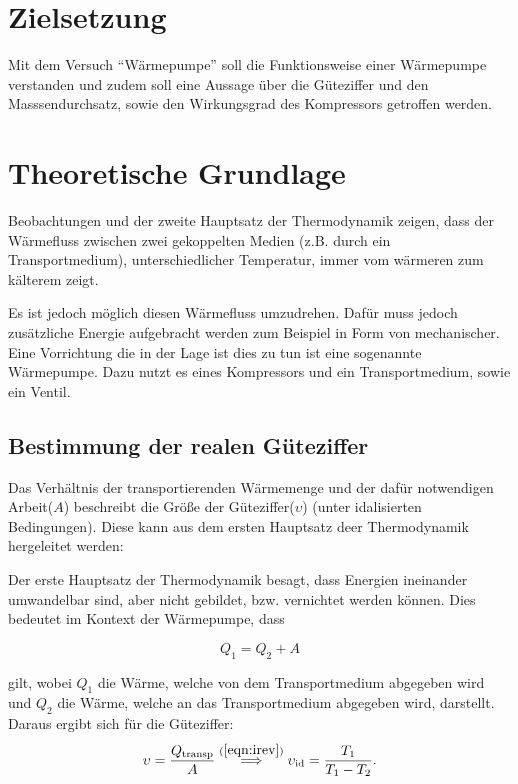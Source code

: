 
\usepackage{longtable}


    \tableofcontents
    
    \newpage
    \section{Zielsetzung}
    Mit dem Versuch "`Wärmepumpe"' soll die Funktionsweise einer Wärmepumpe verstanden und zudem soll eine Aussage über die Güteziffer und den Masssendurchsatz,
    sowie den Wirkungsgrad des Kompressors getroffen werden.

    \section{Theoretische Grundlage}
    Beobachtungen und der zweite Hauptsatz der Thermodynamik zeigen, dass der Wärmefluss zwischen zwei gekoppelten Medien (z.B. durch ein Transportmedium), unterschiedlicher Temperatur, immer vom wärmeren zum kälterem zeigt.

    Es ist jedoch möglich diesen Wärmefluss umzudrehen. Dafür muss jedoch zusätzliche Energie aufgebracht werden zum Beispiel in Form von mechanischer. Eine Vorrichtung die in der Lage ist dies zu tun ist 
    eine sogenannte Wärmepumpe. Dazu nutzt es eines Kompressors und ein Transportmedium, sowie ein Ventil. 

        \subsection{Bestimmung der realen Güteziffer}
    	Das Verhältnis der transportierenden Wärmemenge und der dafür notwendigen Arbeit($A$) beschreibt die Größe der Güteziffer($\upsilon$) (unter idalisierten Bedingungen).
        Diese kann aus dem ersten Hauptsatz deer Thermodynamik hergeleitet werden:

        Der erste Hauptsatz der Thermodynamik besagt, dass Energien ineinander umwandelbar sind, aber nicht gebildet, bzw. vernichtet werden können. 
        Dies bedeutet im Kontext der Wärmepumpe, dass

        \begin{equation}
            Q_1 = Q_2 + A
            \label{eqn:Th1}
        \end{equation}

        gilt, wobei $Q_1$ die Wärme, welche von dem Transportmedium abgegeben wird und $Q_2$ die Wärme, welche an das Transportmedium abgegeben wird, darstellt. Daraus ergibt sich für die Güteziffer:
        \begin{equation}
            \upsilon = \frac{Q_\text{transp}}{A} \stackrel{(\ref{eqn:irev})}{\implies} \upsilon_\text{id} = \frac{T_1}{T_1 - T_2}.
            \label{eqn:Gueteziffer}
        \end{equation}

